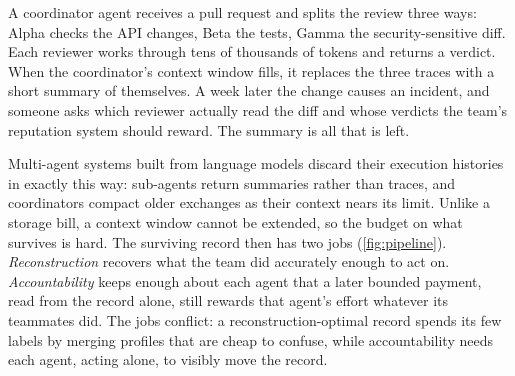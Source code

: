 \documentclass[sigconf,anonymous,acmthm=false]{aamas}
\theoremstyle{acmplain}
\theoremstyle{acmdefinition}
\newcommand{\A}{\textsf{Alpha}}
\newcommand{\B}{\textsf{Beta}}
\newcommand{\G}{\textsf{Gamma}}
\begin{document}
A coordinator agent receives a pull request and splits the review three ways: \A{} checks
the API changes, \B{} the tests, \G{} the security-sensitive diff. Each reviewer works
through tens of thousands of tokens and returns a verdict. When the coordinator's context
window fills, it replaces the three traces with a short summary of themselves. A week
later the change causes an incident, and someone asks which reviewer actually read the
diff and whose verdicts the team's reputation system should reward. The summary is all
that is left.

Multi-agent systems built from language models discard their execution histories in
exactly this way: sub-agents return summaries rather than traces, and coordinators compact
older exchanges as their context nears its limit. Unlike a storage bill, a context window
cannot be extended, so the budget on what survives is hard. The surviving record then has
two jobs (\cref{fig:pipeline}). \emph{Reconstruction} recovers what the team did accurately
enough to act on. \emph{Accountability} keeps enough about each agent that a later bounded
payment, read from the record alone, still rewards that agent's effort whatever its
teammates did. The jobs conflict: a reconstruction-optimal record spends its few labels by
merging profiles that are cheap to confuse, while accountability needs each agent, acting
alone, to visibly move the record.
\end{document}
